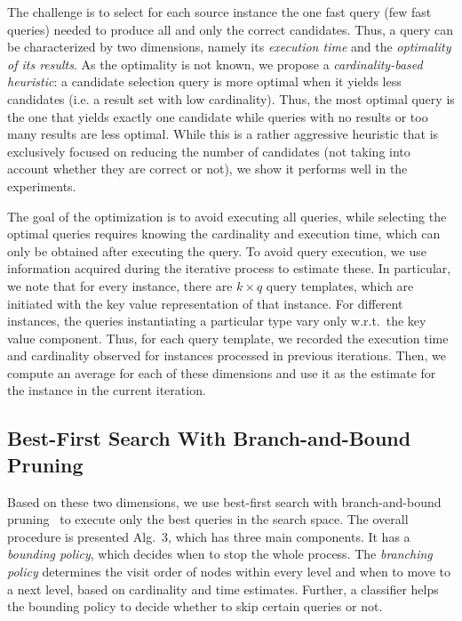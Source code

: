 The challenge is to select for each source instance the one fast query (few fast queries) needed to produce all and only the correct candidates. Thus, a query can be characterized by two dimensions, namely its \emph{execution time} and the \emph{optimality of its results}. As the optimality is not known, we propose a \emph{cardinality-based heuristic}: a candidate selection query is more optimal when it yields less candidates (i.e. a result set with low cardinality). Thus, the most optimal query is the one that yields exactly one candidate while queries with no results or too many results are less optimal. While this is a rather aggressive heuristic that is exclusively focused on reducing the number of candidates (not taking into account whether they are correct or not), we show it performs well in the experiments. 

The goal of the optimization is to avoid executing all queries, while selecting the optimal queries requires knowing the cardinality and execution time, which can only be obtained after executing the query. To avoid query execution, we use information acquired during the iterative process to estimate these. In particular, we note that for every instance, there are $k \times q$ query templates, which are initiated with the key value representation of that instance.  For different instances, the queries instantiating a particular type vary only w.r.t.~the key value component. Thus, for each query template, we recorded the execution time and cardinality observed for instances processed in previous iterations. Then, we compute an average for each of these dimensions and use it as the estimate for the instance in the current iteration. 
 

\subsection{Best-First Search With Branch-and-Bound Pruning} 
Based on these two dimensions, we use best-first search with branch-and-bound pruning~\cite{DBLP:journals/jacm/DechterP85} to execute only the best queries in the search space. The overall procedure is presented Alg.~3, which has three main components. It has a \emph{bounding policy}, which decides when to stop the whole process. The \emph{branching policy} determines the visit order of nodes within every level and when to move to a next level, based on cardinality and time estimates. Further, a classifier helps the bounding policy to decide whether to skip certain queries or not. 

